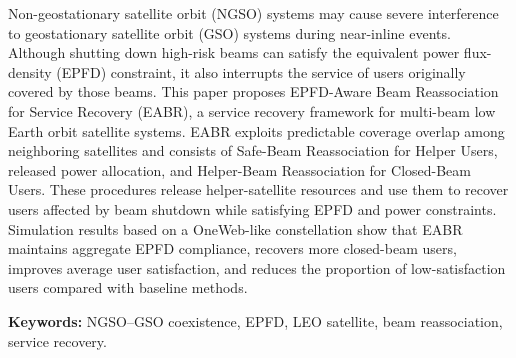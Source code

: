 \documentclass[10pt,a4paper,fontset=none]{ctexart}
\begin{document}
Non-geostationary satellite orbit (NGSO) systems may cause severe interference to geostationary satellite orbit (GSO) systems during near-inline events. Although shutting down high-risk beams can satisfy the equivalent power flux-density (EPFD) constraint, it also interrupts the service of users originally covered by those beams. This paper proposes EPFD-Aware Beam Reassociation for Service Recovery (EABR), a service recovery framework for multi-beam low Earth orbit satellite systems. EABR exploits predictable coverage overlap among neighboring satellites and consists of Safe-Beam Reassociation for Helper Users, released power allocation, and Helper-Beam Reassociation for Closed-Beam Users. These procedures release helper-satellite resources and use them to recover users affected by beam shutdown while satisfying EPFD and power constraints. Simulation results based on a OneWeb-like constellation show that EABR maintains aggregate EPFD compliance, recovers more closed-beam users, improves average user satisfaction, and reduces the proportion of low-satisfaction users compared with baseline methods.

\vspace{0.8em}
\noindent\textbf{Keywords:} NGSO--GSO coexistence, EPFD, LEO satellite, beam reassociation, service recovery.
\end{document}
